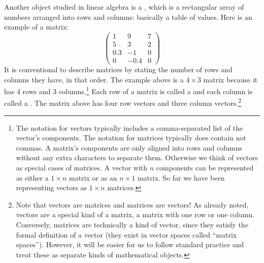    Another object studied in linear algebra is a , which is a 
rectangular array of numbers arranged into rows and columns: basically a table of 
values. Here is an example of a matrix:
\[
\begin{pmatrix}
 1  &   9  & 7 \\
 5  &   3  & 2 \\
0.3 &  -1  & 0 \\
 0  & -0.4 & 0
\end{pmatrix}
\]
It is conventional to describe matrices by stating the number of rows and 
columns they have, in that order. The example above is a $4 \times 3$ 
matrix because it has 4 rows and 3 columns.\footnote{The notation for vectors typically includes a comma-separated list of the vector's components. The notation for matrices typically does contain not commas. A  matrix's components are only aligned into rows and columns without any extra characters to separate them. Otherwise we think of vectors as special cases of matrices. A vector with $n$ components can be represented as either a $1 \times n$ matrix or as an $n \times 1$ matrix. So far we have been representing vectors as $1 \times n$ matrices.}  Each row of a matrix is called a  and each column is called a . The matrix above has four row vectors and 
three column vectors.\footnote{Note that vectors  are matrices and matrices are vectors!  As already noted, vectors are a special kind of a matrix, 
a matrix with one row or one column. Conversely, matrices are technically a 
kind of vector, since they satisfy the formal definition of a vector (they 
exist in vector spaces called ``matrix spaces''). However, it will be easier for us to follow standard practice and treat these as separate kinds of mathematical objects.}

